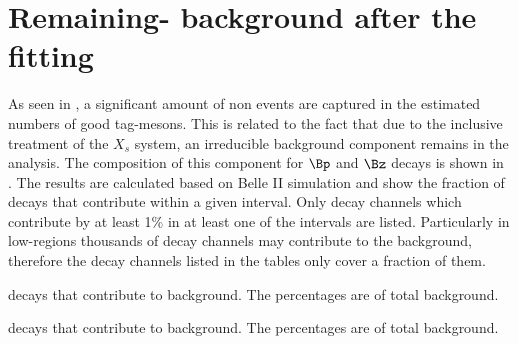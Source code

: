 \chapter{Remaining-\texorpdfstring{\BB}{BB} background after the \texorpdfstring{\Mbc}{Mbc} fitting}\label{sec:appendix_remaining_bb}

As seen in ,
a significant amount of non \BtoXsgamma events are captured in the estimated numbers of good tag-\B mesons.
This is related to the fact that due to the inclusive treatment of the $X_s$ system, 
an irreducible background component remains in the analysis.
The composition of this component for $\Bp$ and $\Bz$ decays is shown in .
The results are calculated based on Belle II simulation and show the fraction of \B decays that contribute within a given \EB interval.
Only decay channels which contribute by at least 1\% in at least one of the \EB intervals are listed.
Particularly in low-\EB regions thousands of decay channels may contribute to the background, therefore the decay channels listed in the tables only cover a fraction of them.
\begin{table}[htbp!]
    \caption{\label{tab:leftover_bz}
    \Bz decays that contribute to background. 
    The percentages are of total \Bz background.}
    
\end{table}
\begin{table}[htbp!]
    \caption{\label{tab:leftover_bp}
    \Bp decays that contribute to background. 
    The percentages are of total \Bp background.}
    
\end{table}

